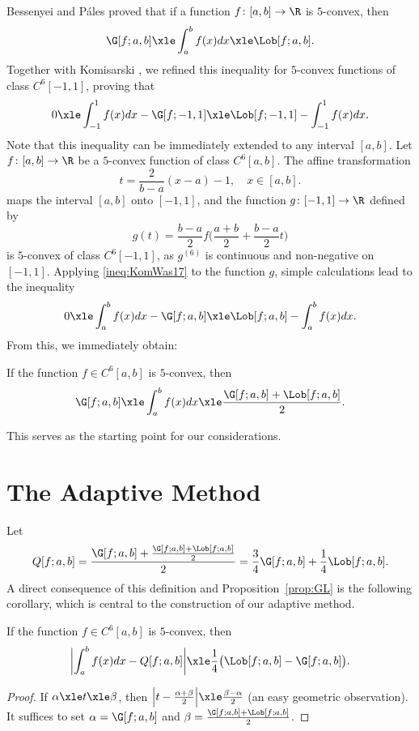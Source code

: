 \documentclass[12pt]{amsart}
\theoremstyle{definition}
\begin{document}
Bessenyei and P\'ales \cite{BesPal02} proved that if a function $f\colon [a,b]\to\R$ is $5$-convex, then
\begin{equation}\label{ineq:BP}
 \G[f;a,b] \xle \int_a^b f(x) dx \xle \Lob[f;a,b].
\end{equation}
Together with Komisarski \cite[Theorem~5]{KomWas17}, we refined this inequality for $5$-convex functions of class $C^6[-1,1]$, proving that
\begin{equation}\label{ineq:KomWas17}
 0 \xle \int_{-1}^1 f(x) dx - \G[f;-1,1] \xle \Lob[f;-1,1] - \int_{-1}^1 f(x) dx.
\end{equation}
Note that this inequality can be immediately extended to any interval $[a,b]$. Let $f\colon [a,b]\to\R$ be a $5$-convex function of class $C^6[a,b]$. The affine transformation
\begin{equation}\label{subst}
 t = \frac{2}{b-a}(x-a)-1,\quad x\in[a,b]. 
\end{equation}
maps the interval $[a,b]$ onto $[-1,1]$, and the function $g\colon[-1,1]\to\R$ defined by
\[
 g(t) = \frac{b-a}{2}f\biggl(\frac{a+b}{2}+\frac{b-a}{2}t\biggr)
\]
is $5$-convex of class $C^6[-1,1]$, as $g^{(6)}$ is continuous and non-negative on $[-1,1]$. Applying \eqref{ineq:KomWas17} to the function $g$, simple calculations lead to the inequality
\[
 0 \xle \int_a^b f(x) dx - \G[f;a,b] \xle \Lob[f;a,b] - \int_a^b f(x) dx.
\]
From this, we immediately obtain:
\begin{prop}\label{prop:GL}
 If the function $f\in C^6[a,b]$ is $5$-convex, then
 \[
  \G[f;a,b] \xle \int_a^b f(x) dx \xle \frac{\G[f;a,b] + \Lob[f;a,b]}{2}.
 \]
\end{prop}
This serves as the starting point for our considerations.

\section{The Adaptive Method}

Let
\[
 Q[f;a,b] = \frac{\G[f;a,b] + \frac{\G[f;a,b] + \Lob[f;a,b]}{2}}{2} = \frac{3}{4}\G[f;a,b] + \frac{1}{4}\Lob[f;a,b].
\]
A direct consequence of this definition and Proposition~\ref{prop:GL} is the following corollary, which is central to the construction of our adaptive method.
\begin{cor}\label{cor:Q}
 If the function $f\in C^6[a,b]$ is $5$-convex, then
 \[
  \biggl|
   \int_a^b f(x) dx - Q[f;a,b]
  \biggr| \xle
  \frac{1}{4}\bigl(\Lob[f;a,b] - \G[f;a,b] \bigr).
 \]
\end{cor}
\begin{proof}
 If $\alpha \xle t \xle \beta$, then $\Bigl|t-\frac{\alpha+\beta}{2}\Bigr| \xle \frac{\beta-\alpha}{2}$ (an easy geometric observation). It suffices to set $\alpha=\G[f;a,b]$ and $\beta=\frac{\G[f;a,b] + \Lob[f;a,b]}{2}$.
\end{proof}
\end{document}

